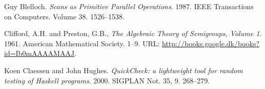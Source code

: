 \begin{thebibliography}{1}




Guy Blelloch. \emph{Scans as Primitive Parallel Operations}. 1987. IEEE
Transactions on Computers. Volume 38. 1526--1538.


Clifford, A.H. and Preston, G.B., \emph{The Algebraic Theory of Semigroups,
Volume 1}. 1961. American Mathematical Society. 1--9. URL:
\url{http://books.google.dk/books?id=Ib0mAAAAMAAJ}.


Koen Claessen and John Hughes. \emph{QuickCheck: a lightweight tool for random
testing of Haskell programs}. 2000. SIGPLAN Not. 35, 9. 268--279.

\end{thebibliography}
